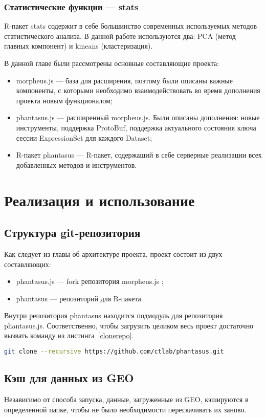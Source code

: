 \documentclass[annotation,specification]{itmo-student-thesis}
\begin{document}
\subsection{Статистические функции --- stats}
R-пакет stats \cite{stats} содержит в себе большинство современных используемых методов статистического анализа.
В данной работе используются два: PCA (метод главных компонент) и kmeans (кластеризация).

\chapterconclusion
В данной главе были рассмотрены основные составляющие проекта:
\begin{itemize}
\item morpheus.js --- база для расширения, поэтому были описаны важные компоненты, с которыми необходимо взаимодействовать во время дополнения проекта новым функционалом;
\item phantasus.js --- расширенный morpheus.js. Были описаны дополнения: новые инструменты, поддержка ProtoBuf, поддержка актуального состояния ключа сессии ExpressionSet для каждого Dataset;
\item R-пакет phantasus --- R-пакет, содержащий в себе серверные реализации всех добавленных методов и инструментов.
\end{itemize}

\chapter{Реализация и использование}
\section{Структура git-репозитория}
Как следует из главы об архитектуре проекта, проект состоит из двух составляющих:
\begin{itemize}
\item phantasus.js --- fork репозитория morpheus.js \cite{morpheus};
\item phantasus --- репозиторий для R-пакета.
\end{itemize}
Внутри репозитория phantasus находится подмодуль для репозитория phantasus.js.
Соответственно, чтобы загрузить целиком весь проект достаточно вызвать команду из листинга~\ref{clonerepo}.
\begin{lstlisting}[float=!h,language=bash,label={clonerepo},caption={Клонирование репозитория проекта phantasus}]
  git clone --recursive https://github.com/ctlab/phantasus.git
\end{lstlisting}

\section{Кэш для данных из GEO}
Независимо от способа запуска, данные, загруженные из GEO, кэшируются в определенной папке, чтобы не было необходимости перескачивать их заново.
\end{document}
